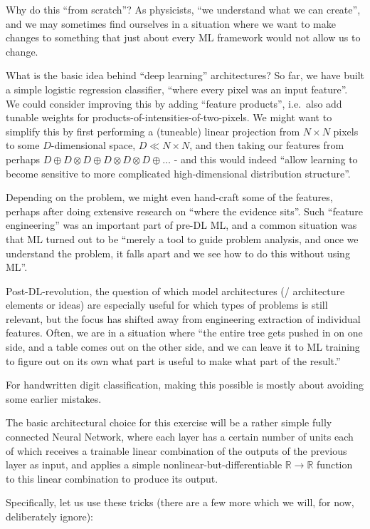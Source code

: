 \documentclass[11pt]{article}
\begin{document}
Why do this ``from scratch''? As physicists, ``we understand what we can
create'', and we may sometimes find ourselves in a situation where we
want to make changes to something that just about every ML framework
would not allow us to change.

What is the basic idea behind ``deep learning'' architectures? So far,
we have built a simple logistic regression classifier, ``where every
pixel was an input feature''. We could consider improving this by adding
``feature products'', i.e.~also add tunable weights for
products-of-intensities-of-two-pixels. We might want to simplify this by
first performing a (tuneable) linear projection from \(N\times N\)
pixels to some \(D\)-dimensional space, \(D\ll N\times N\), and then
taking our features from perhaps
\(D\oplus D\otimes D\oplus D\otimes D\otimes D\oplus\ldots\) - and this
would indeed ``allow learning to become sensitive to more complicated
high-dimensional distribution structure''.

Depending on the problem, we might even hand-craft some of the features,
perhaps after doing extensive research on ``where the evidence sits''.
Such ``feature engineering'' was an important part of pre-DL ML, and a
common situation was that ML turned out to be ``merely a tool to guide
problem analysis, and once we understand the problem, it falls apart and
we see how to do this without using ML''.

Post-DL-revolution, the question of which model architectures (/
architecture elements or ideas) are especially useful for which types of
problems is still relevant, but the focus has shifted away from
engineering extraction of individual features. Often, we are in a
situation where ``the entire tree gets pushed in on one side, and a
table comes out on the other side, and we can leave it to ML training to
figure out on its own what part is useful to make what part of the
result.''

For handwritten digit classification, making this possible is mostly
about avoiding some earlier mistakes.

The basic architectural choice for this exercise will be a rather simple
fully connected Neural Network, where each layer has a certain number of
units each of which receives a trainable linear combination of the
outputs of the previous layer as input, and applies a simple
nonlinear-but-differentiable \({\mathbb R}\to{\mathbb R}\) function to
this linear combination to produce its output.

Specifically, let us use these tricks (there are a few more which we
will, for now, deliberately ignore):
\end{document}
